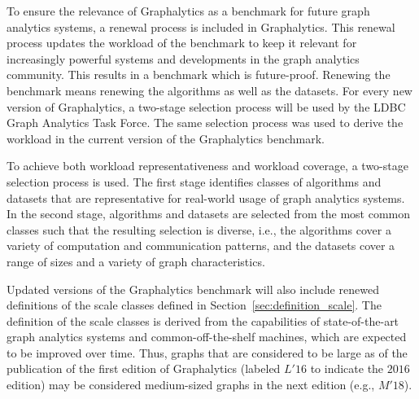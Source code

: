 To ensure the relevance of Graphalytics as a benchmark for future graph analytics systems, a renewal process is included in Graphalytics. This renewal process updates the workload of the benchmark to keep it relevant for increasingly powerful systems and developments in the graph analytics community. This results in a benchmark which is future-proof. Renewing the benchmark means renewing the algorithms as well as the datasets. For every new version of Graphalytics, a two-stage selection process will be used by the LDBC Graph Analytics Task Force. The same selection process was used to derive the workload in the current version of the Graphalytics benchmark.

To achieve both workload representativeness and workload coverage, a two-stage selection process is used. The first stage identifies classes of algorithms and datasets that are representative for real-world usage of graph analytics systems. In the second stage, algorithms and datasets are selected from the most common classes such that the resulting selection is diverse, i.e., the algorithms cover a variety of computation and communication patterns, and the datasets cover a range of sizes and a variety of graph characteristics.

Updated versions of the Graphalytics benchmark will also include renewed definitions of the scale classes defined in Section~\ref{sec:definition_scale}. The definition of the scale classes is derived from the capabilities of state-of-the-art graph analytics systems and common-off-the-shelf machines, which are expected to be improved over time. Thus, graphs that are considered to be large as of the publication of the first edition of Graphalytics (labeled $L'16$ to indicate the $2016$ edition) may be considered medium-sized graphs in the next edition (e.g., $M'18$).

